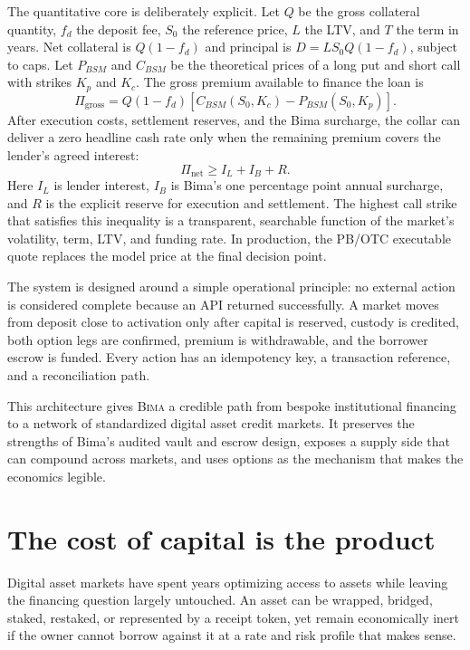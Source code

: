 \documentclass[11pt,oneside]{article}
\newcommand{\Bima}{\textsc{Bima}}
\begin{document}
The quantitative core is deliberately explicit. Let $Q$ be the gross collateral quantity, $f_d$ the deposit fee, $S_0$ the reference price, $L$ the LTV, and $T$ the term in years. Net collateral is $Q(1-f_d)$ and principal is $D=L S_0 Q(1-f_d)$, subject to caps. Let $P_{BSM}$ and $C_{BSM}$ be the theoretical prices of a long put and short call with strikes $K_p$ and $K_c$. The gross premium available to finance the loan is
\[
\Pi_{\mathrm{gross}}=Q(1-f_d)\left[C_{BSM}(S_0,K_c)-P_{BSM}(S_0,K_p)\right].
\]
After execution costs, settlement reserves, and the Bima surcharge, the collar can deliver a zero headline cash rate only when the remaining premium covers the lender's agreed interest:
\[
\Pi_{\mathrm{net}} \geq I_L + I_B + R.
\]
Here $I_L$ is lender interest, $I_B$ is Bima's one percentage point annual surcharge, and $R$ is the explicit reserve for execution and settlement. The highest call strike that satisfies this inequality is a transparent, searchable function of the market's volatility, term, LTV, and funding rate. In production, the PB/OTC executable quote replaces the model price at the final decision point.

The system is designed around a simple operational principle: no external action is considered complete because an API returned successfully. A market moves from deposit close to activation only after capital is reserved, custody is credited, both option legs are confirmed, premium is withdrawable, and the borrower escrow is funded. Every action has an idempotency key, a transaction reference, and a reconciliation path.

This architecture gives \Bima{} a credible path from bespoke institutional financing to a network of standardized digital asset credit markets. It preserves the strengths of Bima's audited vault and escrow design, exposes a supply side that can compound across markets, and uses options as the mechanism that makes the economics legible.

\section{The cost of capital is the product}

Digital asset markets have spent years optimizing access to assets while leaving the financing question largely untouched. An asset can be wrapped, bridged, staked, restaked, or represented by a receipt token, yet remain economically inert if the owner cannot borrow against it at a rate and risk profile that makes sense.
\end{document}
